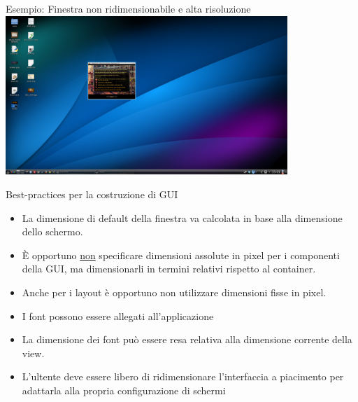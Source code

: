 \documentclass[presentation]{beamer}
\begin{document}
\begin{frame}{Esempio: Finestra non ridimensionabile e alta risoluzione}
\centering
\includegraphics[width=0.8\textwidth]{img/brokensword}
\end{frame}

\begin{frame}{Best-practices per la costruzione di GUI}
\begin{itemize}\itemsep10pt
\item La dimensione di default della finestra va calcolata in base alla dimensione dello schermo.
\item \`{E} opportuno \underline{non} specificare dimensioni assolute in pixel per i componenti della GUI, ma dimensionarli in termini relativi rispetto al container.
\item Anche per i layout è opportuno non utilizzare dimensioni fisse in pixel.
\item I font possono essere allegati all'applicazione
\item La dimensione dei font può essere resa relativa alla dimensione corrente della view.
\item L'ultente deve essere libero di ridimensionare l'interfaccia a piacimento per adattarla alla 
propria configurazione di schermi
\end{itemize}
\end{frame}
\end{document}
